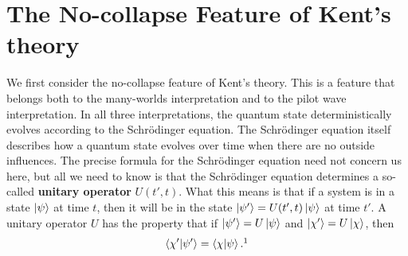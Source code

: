 \section{The No-collapse Feature of Kent's theory}
We first consider the no-collapse feature of Kent's theory. This is a feature that belongs both to the many-worlds interpretation and to the pilot wave interpretation. In all three interpretations, the quantum state deterministically evolves according to the Schr\"{o}dinger equation. The Schr\"{o}dinger equation itself describes how a quantum state evolves over time when there are no outside influences. The precise formula for the Schr\"{o}dinger equation need not concern us here, but all we need to know is that the Schr\"{o}dinger equation determines a so-called \textbf{unitary operator} $U(t',t)$. What this means is that if a system is in a state $\ket{\psi}$ at time $t$, then it will be in the state $\ket{\psi'}=U(t',t)\ket{\psi}$
at time $t'$. A unitary operator $U$ has the property that if $\ket{\psi'}=U\ket{\psi}$ and $\ket{\chi'}=U\ket{\chi}$, then 
\begin{equation}\label{unitarycond}
\ip{\chi'}{\psi'}=\ip{\chi}{\psi}.\protect\footnotemark
\end{equation}
